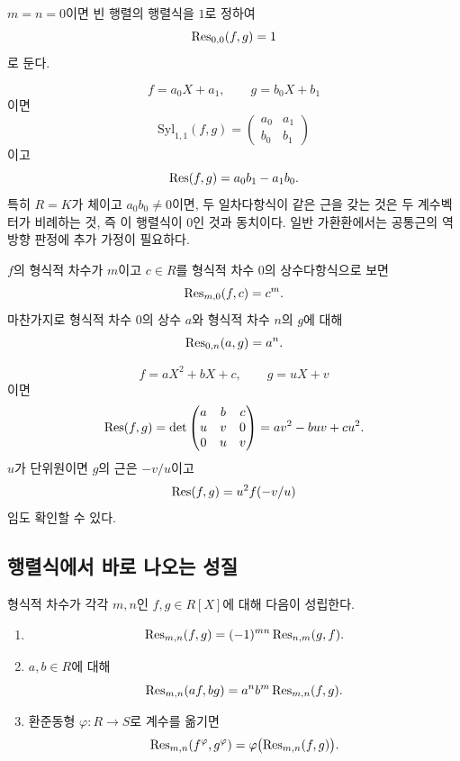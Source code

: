 $m=n=0$이면 빈 행렬의 행렬식을 $1$로 정하여
\[
  \operatorname{Res}_{0,0}(f,g)=1
\]
로 둔다.

\begin{example}[일차식 두 개]
\[
  f=a_0X+a_1,
  \qquad
  g=b_0X+b_1
\]
이면
\[
  \mathrm{Syl}_{1,1}(f,g)
  =\begin{pmatrix}a_0&a_1\\b_0&b_1\end{pmatrix}
\]
이고
\[
  \operatorname{Res}(f,g)=a_0b_1-a_1b_0.
\]
특히 $R=K$가 체이고 $a_0b_0\ne0$이면, 두 일차다항식이 같은 근을 갖는 것은 두 계수벡터가 비례하는 것, 즉 이 행렬식이 $0$인 것과 동치이다. 일반 가환환에서는 공통근의 역방향 판정에 추가 가정이 필요하다.
\end{example}

\begin{example}[상수다항식]
$f$의 형식적 차수가 $m$이고 $c\in R$를 형식적 차수 $0$의 상수다항식으로 보면
\[
  \operatorname{Res}_{m,0}(f,c)=c^m.
\]
마찬가지로 형식적 차수 $0$의 상수 $a$와 형식적 차수 $n$의 $g$에 대해
\[
  \operatorname{Res}_{0,n}(a,g)=a^n.
\]
\end{example}

\begin{example}
\[
  f=aX^2+bX+c,
  \qquad
  g=uX+v
\]
이면
\[
  \operatorname{Res}(f,g)
  =\det
  \begin{pmatrix}
  a&b&c\\
  u&v&0\\
  0&u&v
  \end{pmatrix}
  =av^2-buv+cu^2.
\]
$u$가 단위원이면 $g$의 근은 $-v/u$이고
\[
  \operatorname{Res}(f,g)=u^2f(-v/u)
\]
임도 확인할 수 있다.
\end{example}

\subsection{행렬식에서 바로 나오는 성질}

\begin{proposition}[종결식의 기본 성질]
형식적 차수가 각각 $m,n$인 $f,g\in R[X]$에 대해 다음이 성립한다.
\begin{enumerate}[label=(\roman*)]
  \item
  \[
    \operatorname{Res}_{m,n}(f,g)
    =(-1)^{mn}\operatorname{Res}_{n,m}(g,f).
  \]
  \item $a,b\in R$에 대해
  \[
    \operatorname{Res}_{m,n}(af,bg)
    =a^n b^m\operatorname{Res}_{m,n}(f,g).
  \]
  \item 환준동형 $\varphi:R\to S$로 계수를 옮기면
  \[
    \operatorname{Res}_{m,n}(f^\varphi,g^\varphi)
    =\varphi\bigl(\operatorname{Res}_{m,n}(f,g)\bigr).
  \]
\end{enumerate}
\end{proposition}

